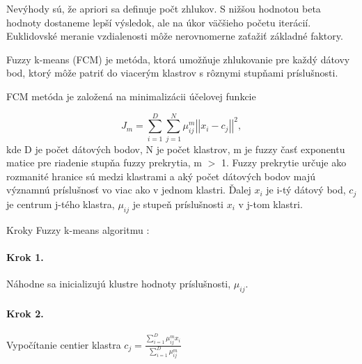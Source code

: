 Nevýhody sú, že apriori sa definuje počt zhlukov. S nižšou hodnotou beta hodnoty dostaneme lepší výsledok, ale na úkor väčšieho početu iterácií. Euklidovské meranie vzdialenosti môže nerovnomerne zaťažiť základné faktory.

% 
% 




Fuzzy k-means (FCM) je metóda, ktorá umožňuje zhlukovanie pre každý dátovy bod, ktorý môže patriť do viacerým klastrov s rôznymi stupňami príslušnosti. 
\cite{Bezdec1981}

FCM metóda je založená na minimalizácii účelovej funkcie

$$J_m = \sum_{i=1}^{D}\sum_{j=1}^{N} { \mu_{ij}^m \left| \left| x_i - c_j \right|\right|^2  },$$ 
kde 
D je počet dátových bodov, N je počet klastrov, m je fuzzy časť exponentu matice pre riadenie stupňa fuzzy prekrytia,  m $>$ 1. 
Fuzzy prekrytie určuje ako rozmanité hranice sú medzi klastrami a aký počet dátových bodov majú významnú príslušnosť vo viac ako v jednom klastri. 
Ďalej $x_i$ je i-tý dátový bod,  $c_j$ je centrum j-tého klastra, $\mu_{ij}$ je stupeň príslušnosti $x_i$ v j-tom klastri. \cite{fuzzyLogicToolbox}
 
Kroky Fuzzy k-means algoritmu : 
\paragraph{Krok 1.} Náhodne sa inicializujú klustre hodnoty príslušnosti, $\mu_{ij}$. 
\paragraph{Krok 2.} Vypočítanie centier klastra
$c_j = \frac{
\sum\limits_{i=1}^D \mu_{ij}^m  x_i 
}{
\sum\limits_{i=1}^D \mu_{ij}^m
}$

